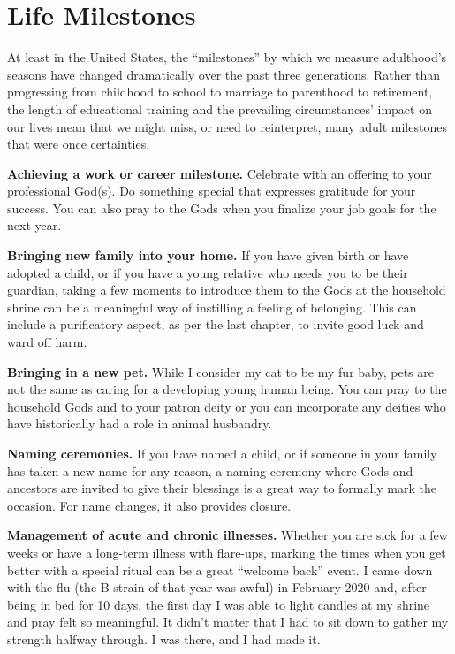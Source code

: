 \documentclass[
]{book}
\begin{document}
\hypertarget{life-milestones}{%
\section{Life Milestones}\label{life-milestones}}

At least in the United States, the ``milestones'' by which we measure adulthood's seasons have changed dramatically over the past three generations. Rather than progressing from childhood to school to marriage to parenthood to retirement, the length of educational training and the prevailing circumstances' impact on our lives mean that we might miss, or need to reinterpret, many adult milestones that were once certainties.

\textbf{Achieving a work or career milestone.} Celebrate with an offering to your professional God(s). Do something special that expresses gratitude for your success. You can also pray to the Gods when you finalize your job goals for the next year.

\textbf{Bringing new family into your home.} If you have given birth or have adopted a child, or if you have a young relative who needs you to be their guardian, taking a few moments to introduce them to the Gods at the household shrine can be a meaningful way of instilling a feeling of belonging. This can include a purificatory aspect, as per the last chapter, to invite good luck and ward off harm.

\textbf{Bringing in a new pet.} While I consider my cat to be my fur baby, pets are not the same as caring for a developing young human being. You can pray to the household Gods and to your patron deity or you can incorporate any deities who have historically had a role in animal husbandry.

\textbf{Naming ceremonies.} If you have named a child, or if someone in your family has taken a new name for any reason, a naming ceremony where Gods and ancestors are invited to give their blessings is a great way to formally mark the occasion. For name changes, it also provides closure.

\textbf{Management of acute and chronic illnesses.} Whether you are sick for a few weeks or have a long-term illness with flare-ups, marking the times when you get better with a special ritual can be a great ``welcome back'' event. I came down with the flu (the B strain of that year was awful) in February 2020 and, after being in bed for 10 days, the first day I was able to light candles at my shrine and pray felt so meaningful. It didn't matter that I had to sit down to gather my strength halfway through. I was there, and I had made it.
\end{document}
